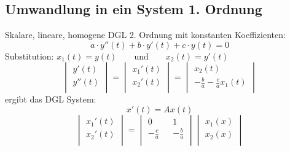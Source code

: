 \subsection{Umwandlung in ein System 1. Ordnung}\label{2to1}
Skalare, lineare, homogene DGL 2. Ordnung mit konstanten Koeffizienten:
\[a \cdot y''(t) + b \cdot y'(t) + c \cdot y(t) = 0 \]
Substitution: \qquad $x_1(t) = y(t) \qquad \text{und} \qquad x_2(t) = y'(t)$\\
\[
	\begin{vmatrix} 
	        y'(t)\\ 
	        y''(t)\\   
	\end{vmatrix}
	=
	\begin{vmatrix} 
	        x_1'(t)\\ 
	        x_2'(t)\\   
	\end{vmatrix}
	=
	\begin{vmatrix} 
	        x_2(t)\\ 
	        -\frac{b}{a} - \frac{c}{a}x_1(t)\\   
	\end{vmatrix}
\]
ergibt das DGL System:\\
\begin{equation*}
x'(t) = Ax(t)
\end{equation*}
\begin{equation*}
	\begin{vmatrix} 
	        x_1'(t)\\ 
	        x_2'(t)\\   
	\end{vmatrix}
	=
	\begin{vmatrix} 
	        0 && 1\\ 
	       -\frac{c}{a} && -\frac{b}{a}\\   
	\end{vmatrix}
	\begin{vmatrix} 
	        x_1(x)\\ 
	        x_2(x)\\   
	\end{vmatrix}
\end{equation*}

